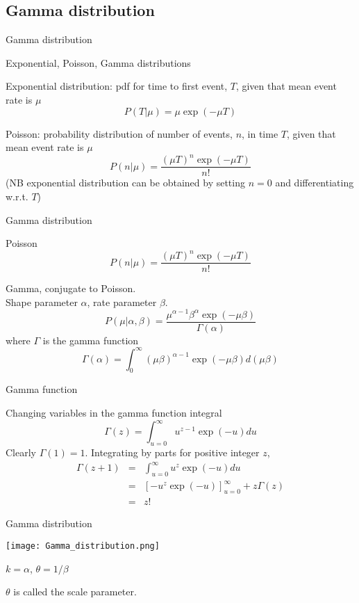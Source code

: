 \documentclass{beamer}
\begin{document}
\subsection{Gamma distribution}

\begin{frame}{Gamma distribution}

\itemb
\item Exponential, Poisson, Gamma distributions
 \itemb
 \item Exponential distribution: pdf for time to first event, $T$, given that mean event rate is $\mu$
\[
P(T|\mu) = \mu \exp(-\mu T)
\]
 \item Poisson: probability distribution of number of events, $n$, in time $T$, given that mean event rate is $\mu$
\[
P(n|\mu) = \frac{(\mu T)^n \exp(-\mu T)}{n!}
\]
(NB exponential distribution can be obtained by setting $n=0$ and differentiating w.r.t. $T$)
\iteme
\iteme


\end{frame}


\begin{frame}{Gamma distribution}

\itemb
 \item Poisson
\[
P(n|\mu) = \frac{(\mu T)^n \exp(-\mu T)}{n!}
\]
 \item Gamma, conjugate to Poisson. \\
Shape parameter $\alpha$, rate parameter $\beta$.
\[
P(\mu|\alpha,\beta) = \frac{\mu^{\alpha-1} \beta^\alpha \exp(-\mu \beta)}{\Gamma(\alpha)}
\]
where $\Gamma$ is the \alert{gamma function}
\[
\Gamma(\alpha) = \int_0^{\infty} (\mu\beta)^{\alpha-1} \exp(-\mu \beta) d(\mu \beta)
\]
\iteme


\end{frame}


\begin{frame}{Gamma function}

Changing variables in the gamma function integral
\[
\Gamma(z) = \int_{u=0}^\infty u^{z-1} \exp(-u) du
\]
Clearly $\Gamma(1)=1$. Integrating by parts for positive integer $z$,
\begin{eqnarray*}
\Gamma(z+1) & = & \int_{u=0}^\infty u^z \exp(-u) du \\
& = & \left[ -u^z \exp(-u) \right]_{u=0}^\infty + z \Gamma(z) \\
& = & z!
\end{eqnarray*}


\end{frame}

\begin{frame}{Gamma distribution}

  \texttt{[image: Gamma\_distribution.png]}

$k=\alpha$, $\theta = 1/\beta$

$\theta$ is called the scale parameter.

\end{frame}
\end{document}
